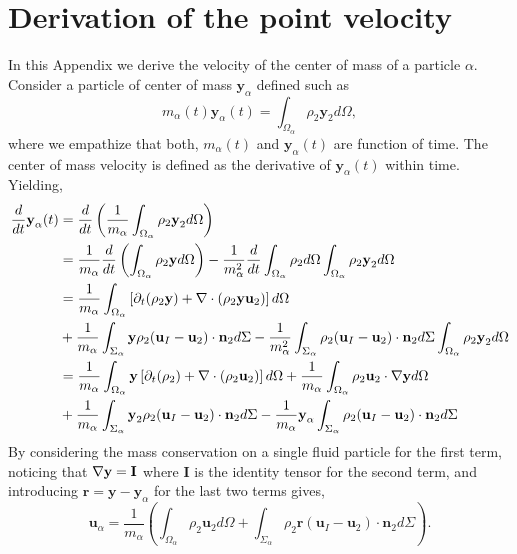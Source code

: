 \section{Derivation of the point velocity}
\label{ap:velocity_definition}
In this Appendix we derive the velocity of the center of mass of a particle $\alpha$. Consider a particle of center of mass $\textbf{y}_\alpha$ defined such as
\begin{equation*}
    m_\alpha(t) \textbf{y}_\alpha(t)
    = \int_{\Omega_\alpha} \rho_2 \textbf{y}_2 d\Omega,
\end{equation*}
where we empathize that both, $m_\alpha(t)$ and $\textbf{y}_\alpha(t)$ are function of time. 
The center of mass velocity is defined as the derivative of $\textbf{y}_\alpha(t)$ within time.
Yielding, 
\begin{align*}
    \frac{d}{dt} \textbf{y}_\alpha (t)
    &=
    \frac{d}{dt} \left(
        \frac{1}{m_\alpha} \int_{\Omega_\alpha} \rho_2 \textbf{y}_2 d\Omega
    \right)\\
    &= \frac{1}{m_\alpha}
    \frac{d}{dt} 
    \left(
        \int_{\Omega_\alpha} \rho_2 \textbf{y} d\Omega
    \right)
    - \frac{1}{m_\alpha^2} \frac{d}{dt} \int_{\Omega_\alpha} \rho_2 d\Omega \int_{\Omega_\alpha} \rho_2 \textbf{y}_2 d\Omega
    \\
    &= \frac{1}{m_\alpha}\int_{\Omega_\alpha} \left[
        \partial_t (\rho_2 \textbf{y}) + \mathbf{\nabla}\cdot\left(\rho_2 \textbf{y}\textbf{u}_2\right) 
    \right]d\Omega \\
    &+ \frac{1}{m_\alpha}\int_{\Sigma_\alpha} \textbf{y} \rho_2(\textbf{u}_I   - \textbf{u}_2) \cdot \textbf{n}_2 d \Sigma
    -  \frac{1}{m_\alpha^2} \int_{\Sigma_\alpha} \rho_2(\textbf{u}_I   - \textbf{u}_2) \cdot \textbf{n}_2 d\Sigma  \int_{\Omega_\alpha} \rho_2 \textbf{y}_2 d\Omega
    \\
    &= \frac{1}{m_\alpha}\int_{\Omega_\alpha} \textbf{y} \left[
    \partial_t (\rho_2) + \mathbf{\nabla}\cdot\left(\rho_2 \textbf{u}_2\right) 
    \right]d\Omega
    + \frac{1}{m_\alpha}\int_{\Omega_\alpha} \rho_2  \textbf{u}_2  \cdot \mathbf{\nabla} \textbf{y} d\Omega \\
    &+ \frac{1}{m_\alpha}\int_{\Sigma_\alpha} \textbf{y}_2 \rho_2 (\textbf{u}_I - \textbf{u}_2) \cdot \textbf{n}_2 d \Sigma
    - \frac{1}{m_\alpha}  \textbf{y}_\alpha \int_{\Sigma_\alpha} \rho_2(\textbf{u}_I   - \textbf{u}_2) \cdot \textbf{n}_2 d\Sigma
\end{align*}
By considering the mass conservation on a single fluid particle for the first term, noticing that $\mathbf{\nabla} \textbf{y} = \textbf{I}$ where $\textbf{I}$ is the identity tensor for the second term, and introducing $\mathbf{r} = \mathbf{y} - \mathbf{y}_\alpha$ for the last two terms gives, 
\begin{equation*}
    \textbf{u}_\alpha
    = \frac{1}{m_\alpha} \left(
        \int_{\Omega_\alpha} \rho_2 \textbf{u}_2 d\Omega
        +  \int_{\Sigma_\alpha} \rho_2 \textbf{r}  (\textbf{u}_I - \textbf{u}_2) \cdot \textbf{n}_2 d\Sigma
    \right).
    \label{eq:vel_def}
\end{equation*}

